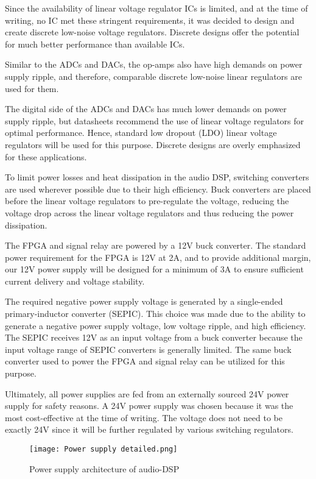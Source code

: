 Since the availability of linear voltage regulator ICs is limited, and at the time of writing, no IC met these stringent requirements, it was decided to design and create discrete low-noise voltage regulators. Discrete designs offer the potential for much better performance than available ICs.

Similar to the ADCs and DACs, the op-amps also have high demands on power supply ripple, and therefore, comparable discrete low-noise linear regulators are used for them.

The digital side of the ADCs and DACs has much lower demands on power supply ripple, but datasheets recommend the use of linear voltage regulators for optimal performance. Hence, standard low dropout (LDO) linear voltage regulators will be used for this purpose. Discrete designs are overly emphasized for these applications.

To limit power losses and heat dissipation in the audio DSP, switching converters are used wherever possible due to their high efficiency. Buck converters are placed before the linear voltage regulators to pre-regulate the voltage, reducing the voltage drop across the linear voltage regulators and thus reducing the power dissipation.

The FPGA and signal relay are powered by a 12V buck converter. The standard power requirement for the FPGA is 12V at 2A, and to provide additional margin, our 12V power supply will be designed for a minimum of 3A to ensure sufficient current delivery and voltage stability.

The required negative power supply voltage is generated by a single-ended primary-inductor converter (SEPIC). This choice was made due to the ability to generate a negative power supply voltage, low voltage ripple, and high efficiency. The SEPIC receives 12V as an input voltage from a buck converter because the input voltage range of SEPIC converters is generally limited. The same buck converter used to power the FPGA and signal relay can be utilized for this purpose.

Ultimately, all power supplies are fed from an externally sourced 24V power supply for safety reasons. A 24V power supply was chosen because it was the most cost-effective at the time of writing. The voltage does not need to be exactly 24V since it will be further regulated by various switching regulators.

\begin{figure}[ht]
    \texttt{[image: Power supply detailed.png]}\\    
    \caption{Power supply architecture of audio-DSP}
    \label{fig:arch-power-supply}
\end{figure}